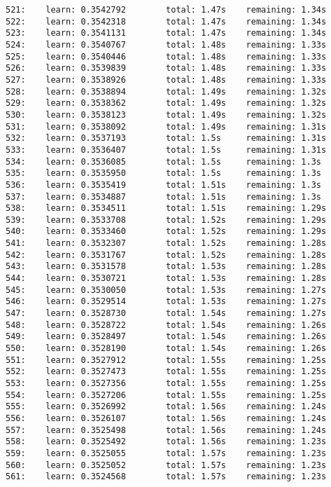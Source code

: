 \documentclass[11pt]{article}
\begin{document}
\begin{Verbatim}[commandchars=\\\{\}]
521:    learn: 0.3542792        total: 1.47s    remaining: 1.34s
522:    learn: 0.3542318        total: 1.47s    remaining: 1.34s
523:    learn: 0.3541131        total: 1.47s    remaining: 1.34s
524:    learn: 0.3540767        total: 1.48s    remaining: 1.33s
525:    learn: 0.3540446        total: 1.48s    remaining: 1.33s
526:    learn: 0.3539839        total: 1.48s    remaining: 1.33s
527:    learn: 0.3538926        total: 1.48s    remaining: 1.33s
528:    learn: 0.3538894        total: 1.49s    remaining: 1.32s
529:    learn: 0.3538362        total: 1.49s    remaining: 1.32s
530:    learn: 0.3538123        total: 1.49s    remaining: 1.32s
531:    learn: 0.3538092        total: 1.49s    remaining: 1.31s
532:    learn: 0.3537193        total: 1.5s     remaining: 1.31s
533:    learn: 0.3536407        total: 1.5s     remaining: 1.31s
534:    learn: 0.3536085        total: 1.5s     remaining: 1.3s
535:    learn: 0.3535950        total: 1.5s     remaining: 1.3s
536:    learn: 0.3535419        total: 1.51s    remaining: 1.3s
537:    learn: 0.3534887        total: 1.51s    remaining: 1.3s
538:    learn: 0.3534511        total: 1.51s    remaining: 1.29s
539:    learn: 0.3533708        total: 1.52s    remaining: 1.29s
540:    learn: 0.3533460        total: 1.52s    remaining: 1.29s
541:    learn: 0.3532307        total: 1.52s    remaining: 1.28s
542:    learn: 0.3531767        total: 1.52s    remaining: 1.28s
543:    learn: 0.3531578        total: 1.53s    remaining: 1.28s
544:    learn: 0.3530721        total: 1.53s    remaining: 1.28s
545:    learn: 0.3530050        total: 1.53s    remaining: 1.27s
546:    learn: 0.3529514        total: 1.53s    remaining: 1.27s
547:    learn: 0.3528730        total: 1.54s    remaining: 1.27s
548:    learn: 0.3528722        total: 1.54s    remaining: 1.26s
549:    learn: 0.3528497        total: 1.54s    remaining: 1.26s
550:    learn: 0.3528190        total: 1.54s    remaining: 1.26s
551:    learn: 0.3527912        total: 1.55s    remaining: 1.25s
552:    learn: 0.3527473        total: 1.55s    remaining: 1.25s
553:    learn: 0.3527356        total: 1.55s    remaining: 1.25s
554:    learn: 0.3527206        total: 1.55s    remaining: 1.25s
555:    learn: 0.3526992        total: 1.56s    remaining: 1.24s
556:    learn: 0.3526107        total: 1.56s    remaining: 1.24s
557:    learn: 0.3525498        total: 1.56s    remaining: 1.24s
558:    learn: 0.3525492        total: 1.56s    remaining: 1.23s
559:    learn: 0.3525055        total: 1.57s    remaining: 1.23s
560:    learn: 0.3525052        total: 1.57s    remaining: 1.23s
561:    learn: 0.3524568        total: 1.57s    remaining: 1.23s

\end{Verbatim}
\end{document}
